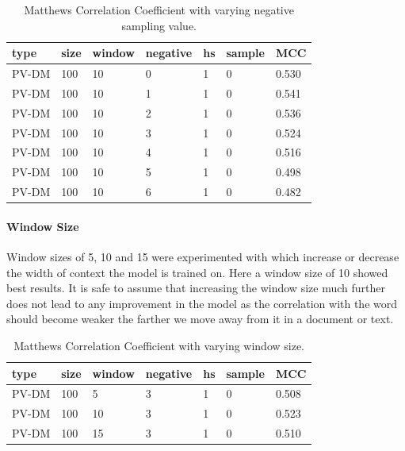 \begin{table}[h]
  \begin{center}
  \begin{tabular}{ *6l | l }
    \toprule
    type & size & window & negative & hs & sample & MCC  \\
    \midrule
    PV-DM & 100 & 10 & 0 & 1 & 0 & 0.530 \\
    PV-DM & 100 & 10 & 1 & 1 & 0 & 0.541 \\
    PV-DM & 100 & 10 & 2 & 1 & 0 & 0.536 \\
    PV-DM & 100 & 10 & 3 & 1 & 0 & 0.524 \\
    PV-DM & 100 & 10 & 4 & 1 & 0 & 0.516 \\
    PV-DM & 100 & 10 & 5 & 1 & 0 & 0.498 \\
    PV-DM & 100 & 10 & 6 & 1 & 0 & 0.482 \\
    \bottomrule
  \end{tabular}
  \caption{Matthews Correlation Coefficient with varying negative sampling value.}
\label{tab:Paragraph Vector Parameter Results Hierarchical Softmax}
\end{center}
\end{table}

\paragraph{Window Size}
Window sizes of 5, 10 and 15 were experimented with which increase or decrease the width of context the model is trained on. Here a window size of 10 showed best results. It is safe to assume that increasing the window size much further does not lead to any improvement in the model as the correlation with the word should become weaker the farther we move away from it in a document or text.


\begin{table}[h]
  \begin{center}
  \begin{tabular}{ *6l | l }
    \toprule
    type & size & window & negative & hs & sample & MCC  \\
    \midrule
    PV-DM & 100 & 5 & 3 & 1 & 0 & 0.508 \\
    PV-DM & 100 & 10 & 3 & 1 & 0 & 0.523 \\
    PV-DM & 100 & 15 & 3 & 1 & 0 & 0.510 \\
    \bottomrule
  \end{tabular}
  \caption{Matthews Correlation Coefficient with varying window size.}
\label{tab:Paragraph Vector Parameter Results Hierarchical Softmax}
\end{center}
\end{table}

